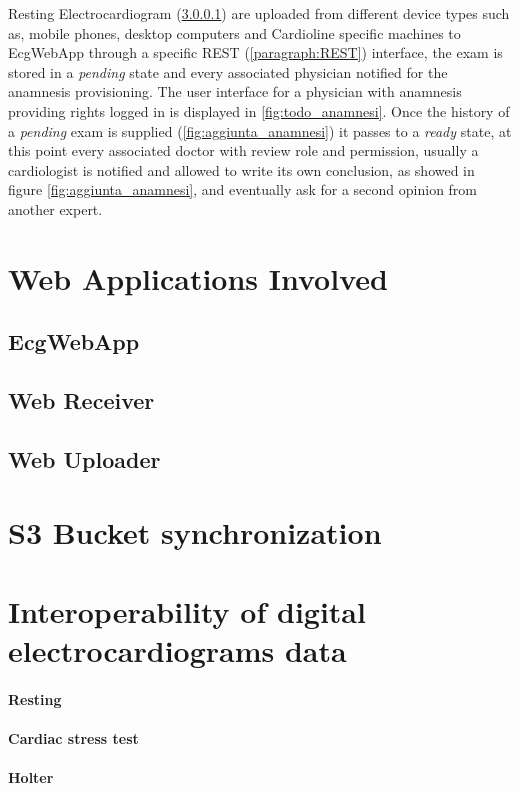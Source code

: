 Resting Electrocardiogram (\ref{paragraph:Resting}) are uploaded from different device types such as, mobile phones, desktop computers and Cardioline specific machines to EcgWebApp through a specific REST (\ref{paragraph:REST}) interface, the exam is stored in a \textit{pending} state and every associated physician notified for the anamnesis provisioning.
The user interface for a physician with anamnesis providing rights logged in is displayed in \ref{fig:todo_anamnesi}.
Once the history of a \textit{pending} exam is supplied (\ref{fig:aggiunta_anamnesi}) it passes to a \textit{ready} state, at this point every associated doctor with review role and permission, usually a cardiologist is notified and allowed to write its own conclusion, as showed in figure \ref{fig:aggiunta_anamnesi}, and eventually ask for a second opinion from another expert.

\section{Web Applications Involved}
\subsection{EcgWebApp}
\label{subsection:ecgwebapp}
\subsection{Web Receiver}
\label{subsection:webreceiver}
\subsection{Web Uploader}
\section{S3 Bucket synchronization}
\section{Interoperability of digital electrocardiograms data}
\paragraph{Resting}
\label{paragraph:Resting}
\paragraph{Cardiac stress test}
\label{paragraph:Cardiac stress test}
\paragraph{Holter}
\label{paragraph:Holter}

